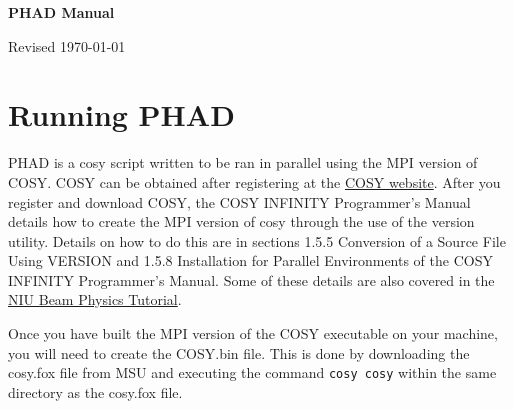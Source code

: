 \documentclass[oneside,12pt]{book}
\begin{document}
\setlength{\parindent}{0pt}
\setlength{\parskip}{12pt}
\setlength{\columnsep}{0.4in}


\begin{titlepage}

\vspace*{\fill}

\begin{center}
\begin{Huge}\textbf{PHAD Manual}\end{Huge}

\bigskip
{\LARGE Revised \today}

\end{center}

\vspace*{\fill}

\end{titlepage}



\begingroup


\let\cleardoublepage\clearpage
\tableofcontents
\endgroup

\begingroup
\let\cleardoublepage\clearpage
\listoftables
\listofdatafiles
\endgroup



\newpage


\chapter{Running PHAD}

PHAD is a cosy script written to be ran in parallel using the MPI version of COSY.  COSY can be obtained after registering at the \href{http://www.bt.pa.msu.edu/index_cosy.htm}{COSY website}.  After you register and download COSY, the COSY INFINITY Programmer's Manual details how to create the MPI version of cosy through the use of the version utility.  Details on how to do this are in sections 1.5.5
Conversion of a Source File Using VERSION and 1.5.8
Installation for Parallel Environments of the COSY INFINITY Programmer's Manual.  Some of these details are also covered in the \href{http://niu.edu/beamphysicscode/local_users/}{NIU Beam Physics Tutorial}.

Once you have built the MPI version of the COSY executable on your machine, you will need to create the COSY.bin file.  This is done by downloading the cosy.fox file from MSU and executing the command \texttt{cosy cosy} within the same directory as the cosy.fox file.
\end{document}
